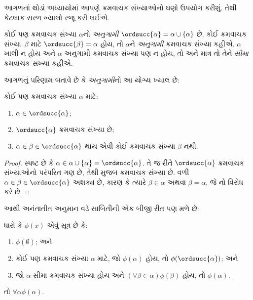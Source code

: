 \documentclass[../../../include/open-logic-section]{subfiles}
\begin{document}

આગળનાં થોડાં અધ્યાયોમાં આપણે ક્રમવાચક સંખ્યાઓનો ઘણો ઉપયોગ
કરીશું. તેથી કેટલાક સરળ ખ્યાલો રજૂ કરી લઈએ.

\begin{defn}
કોઈ પણ ક્રમવાચક સંખ્યા $\alpha$નો \emph{અનુગામી}
$\ordsucc{\alpha}
=\alpha \cup \{\alpha\}$ છે. કોઈ ક્રમવાચક સંખ્યા~$\beta$ માટે
$\ordsucc{\beta} = \alpha$ હોય, તો $\alpha$ને
\emph{અનુગામી} ક્રમવાચક સંખ્યા કહીએ. $\alpha$ ખાલી ન હોય અને
$\alpha$ અનુગામી ક્રમવાચક સંખ્યા પણ ન હોય, તો અને માત્ર તો તેને
\emph{સીમા} ક્રમવાચક સંખ્યા કહીએ.
\end{defn}
\noindent
આગળનું પરિણામ બતાવે છે કે \emph{અનુગામી}નો આ યોગ્ય ખ્યાલ છે:

\begin{prop}
કોઈ પણ ક્રમવાચક સંખ્યા $\alpha$ માટે:
\begin{enumerate}
	\item $\alpha \in \ordsucc{\alpha}$;
	\item $\ordsucc{\alpha}$ ક્રમવાચક સંખ્યા છે;
	\item $\alpha \in \beta \in
	\ordsucc{\alpha}$ થાય એવી કોઈ ક્રમવાચક સંખ્યા $\beta$ નથી.
	\end{enumerate}
\end{prop}

\begin{proof}
સ્પષ્ટ છે કે $\alpha \in \alpha \cup \{\alpha\} = \ordsucc{\alpha}$.
તે જ રીતે $\ordsucc{\alpha}$ ક્રમવાચક સંખ્યાઓનો પરંપરિત ગણ છે,
તેથી  મુજબ ક્રમવાચક સંખ્યા છે.
વળી $\alpha \in \beta \in \ordsucc{\alpha}$ અશક્ય છે,
કારણ કે ત્યારે $\beta \in \alpha$ અથવા $\beta = \alpha$,
જે નો વિરોધ કરે છે.
\end{proof}
\noindent
આથી અનંતાતીત અનુમાન વડે સાબિતીની એક બીજી રીત પણ મળે છે:

\begin{thm}[સરળ અનંતાતીત અનુમાન]
ધારો કે $\phi(x)$ એવું સૂત્ર છે કે:
\begin{enumerate}
	\item $\phi(\emptyset)$; અને
	\item કોઈ પણ ક્રમવાચક સંખ્યા $\alpha$ માટે, જો $\phi(\alpha)$ હોય, તો
	$\phi(\ordsucc{\alpha})$; અને
	\item જો $\alpha$ સીમા ક્રમવાચક સંખ્યા હોય અને $(\forall \beta \in
	\alpha)\phi(\beta)$ હોય, તો $\phi(\alpha)$.
\end{enumerate}
તો $\forall \alpha \phi(\alpha)$.
\end{thm}
\end{document}
